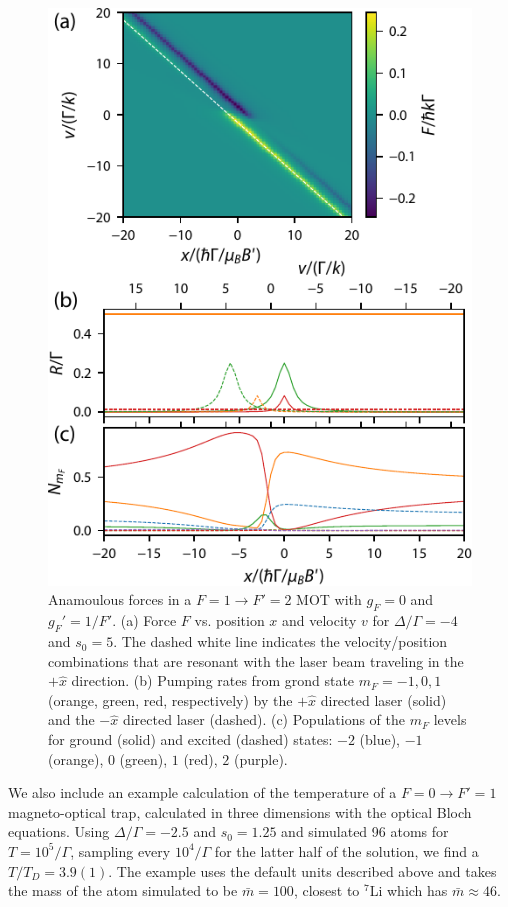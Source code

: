 \documentclass[final,5p,times,twocolumn]{elsarticle}
\begin{document}
\begin{figure}
	\center
	\includegraphics{figs/F1_to_F2_MOT_merged}
	\caption{\label{fig:mot_F1_to_F2} Anamoulous forces in a $F=1\rightarrow F'=2$ MOT with $g_F=0$ and $g_F'=1/F'$.  (a) Force $F$ vs. position $x$ and velocity $v$ for $\Delta/\Gamma=-4$ and $s_0=5$.  The dashed white line indicates the velocity/position combinations that are resonant with the laser beam traveling in the $+\hat{x}$ direction.  (b) Pumping rates from grond state $m_F=-1, 0, 1$ (orange, green, red, respectively) by the $+\hat{x}$ directed laser (solid) and the $-\hat{x}$ directed laser (dashed).  (c) Populations of the $m_F$ levels for ground (solid) and excited (dashed) states: $-2$ (blue), $-1$ (orange), $0$ (green), $1$ (red), $2$ (purple).}
\end{figure}

We also include an example calculation of the temperature of a $F=0\rightarrow F'=1$ magneto-optical trap, calculated in three dimensions with the optical Bloch equations.  Using $\Delta/\Gamma=-2.5$ and $s_0=1.25$ and simulated 96 atoms for $T=10^5/\Gamma$, sampling every $10^4/\Gamma$ for the latter half of the solution, we find a $T/T_D=3.9(1)$.  The example uses the default units described above and takes the mass of the atom simulated to be $\bar{m}=100$, closest to $^7$Li which has $\bar{m}\approx 46$.
\end{document}
